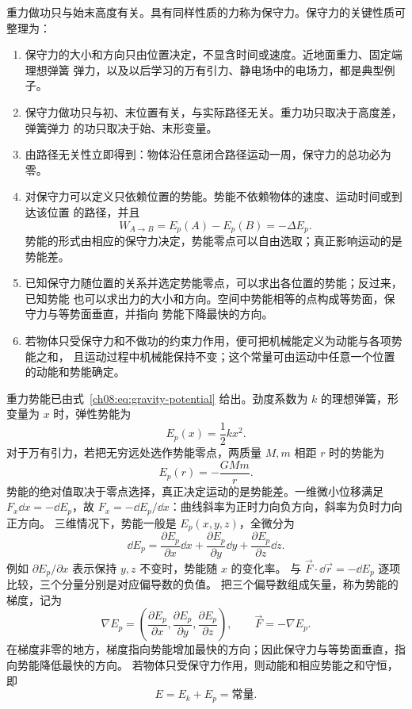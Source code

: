 重力做功只与始末高度有关。具有同样性质的力称为保守力。保守力的关键性质可整理为：
\begin{enumerate}[leftmargin=2.2em]
 \item 保守力的大小和方向只由位置决定，不显含时间或速度。近地面重力、固定端理想弹簧
 弹力，以及以后学习的万有引力、静电场中的电场力，都是典型例子。
 \item 保守力做功只与初、末位置有关，与实际路径无关。重力功只取决于高度差，弹簧弹力
 的功只取决于始、末形变量。
 \item 由路径无关性立即得到：物体沿任意闭合路径运动一周，保守力的总功必为零。
 \item 对保守力可以定义只依赖位置的势能。势能不依赖物体的速度、运动时间或到达该位置
 的路径，并且
 \[
 W_{A\to B}=E_p(A)-E_p(B)=-\Delta E_p.
 \]
 势能的形式由相应的保守力决定，势能零点可以自由选取；真正影响运动的是势能差。
 \item 已知保守力随位置的关系并选定势能零点，可以求出各位置的势能；反过来，已知势能
 也可以求出力的大小和方向。空间中势能相等的点构成等势面，保守力与等势面垂直，并指向
 势能下降最快的方向。
 \item 若物体只受保守力和不做功的约束力作用，便可把机械能定义为动能与各项势能之和，
 且运动过程中机械能保持不变；这个常量可由运动中任意一个位置的动能和势能确定。
\end{enumerate}
重力势能已由式~\eqref{ch08:eq:gravity-potential} 给出。劲度系数为 $k$ 的理想弹簧，形变量为 $x$ 时，弹性势能为
\begin{equation}
 E_p(x)=\frac12kx^2.
\end{equation}
对于万有引力，若把无穷远处选作势能零点，两质量 $M,m$ 相距 $r$ 时的势能为
\begin{equation}
 E_p(r)=-\frac{GMm}{r}.
\end{equation}
势能的绝对值取决于零点选择，真正决定运动的是势能差。一维微小位移满足
$F_x\dd x=-\dd E_p$，故 $F_x=-\dd E_p/\dd x$：曲线斜率为正时力向负方向，斜率为负时力向正方向。
三维情况下，势能一般是 $E_p(x,y,z)$，全微分为
\[
 \dd E_p=\frac{\partial E_p}{\partial x}\dd x+
 \frac{\partial E_p}{\partial y}\dd y+\frac{\partial E_p}{\partial z}\dd z.
\]
例如 $\partial E_p/\partial x$ 表示保持 $y,z$ 不变时，势能随 $x$ 的变化率。
与 $\vec F\cdot\dd\vec r=-\dd E_p$ 逐项比较，三个分量分别是对应偏导数的负值。
把三个偏导数组成矢量，称为势能的梯度，记为
\[
 \nabla E_p=\left(\frac{\partial E_p}{\partial x},\frac{\partial E_p}{\partial y},\frac{\partial E_p}{\partial z}\right),
 \qquad \vec F=-\nabla E_p.
\]
在梯度非零的地方，梯度指向势能增加最快的方向；因此保守力与等势面垂直，指向势能降低最快的方向。
若物体只受保守力作用，则动能和相应势能之和守恒，即
\[
 E=E_k+E_p=\text{常量}.
\]

